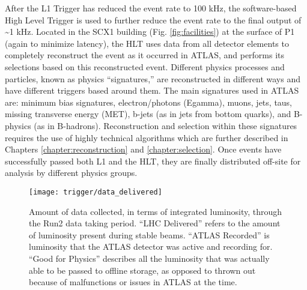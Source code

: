         After the L1 Trigger has reduced the event rate to 100 kHz, the software-based High Level Trigger is used to further reduce the event rate to the final output of \textasciitilde 1 kHz.
        Located in the SCX1 building (Fig. \ref{fig:facilities}) at the surface of P1 (again to minimize latency),
            the HLT uses data from all detector elements to completely reconstruct the event as it occurred in ATLAS,
            and performs its selections based on this reconstructed event.
        Different physics processes and particles, known as physics ``signatures,'' are reconstructed in different ways
            and have different triggers based around them. 
        The main signatures used in ATLAS are:
            minimum bias signatures, electron/photons (Egamma), muons, jets, taus,
            missing transverse energy (MET), b-jets (as in jets from bottom quarks), and B-physics (as in B-hadrons).
        Reconstruction and selection within these signatures requires the use of highly technical algorithms
            which are further described in Chapters \ref{chapter:reconstruction} and \ref{chapter:selection}.
        Once events have successfully passed both L1 and the HLT, they are finally distributed off-site for analysis by different physics groups.

        \begin{figure}[h] \centering
            \texttt{[image: trigger/data\_delivered]}
            \caption{Amount of data collected, in terms of integrated luminosity,
                through the Run2 data taking period\cite{data_quality}.
                ``LHC Delivered'' refers to the amount of luminosity present during stable beams.
                ``ATLAS Recorded'' is luminosity that the ATLAS detector was active and recording for.
                ``Good for Physics'' describes all the luminosity that was actually able to be passed to offline storage,
                    as opposed to thrown out because of malfunctions or issues in ATLAS at the time.
            }
            \label{fig:data_delivered}
        \end{figure}


